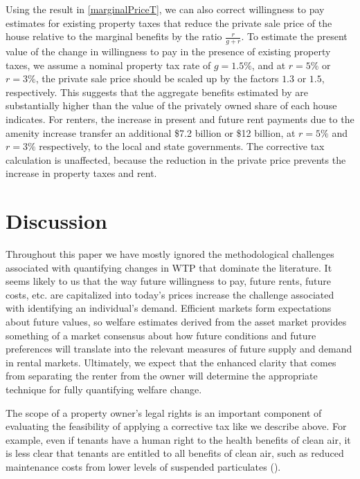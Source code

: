 \documentclass[ecta,nameyear,draft]{econsocart}
\theoremstyle{plain}
\theoremstyle{remark}
\begin{document}
Using the result in \ref{marginalPriceT}, we can also correct willingness to pay estimates for existing property taxes that reduce the private sale price of the house relative to the marginal benefits by the ratio $\frac{r}{g+r}$. To estimate the present value of the change in willingness to pay in the presence of existing property taxes, we assume a nominal property tax rate of $g=1.5\%$, and at $r=5\%$ or $r=3\%$, the private sale price should be scaled up by the factors $1.3$ or $1.5$, respectively. This suggests that the aggregate benefits estimated by \cite{chaygreenstone05} are substantially higher than the value of the privately owned share of each house indicates. For renters, the increase in present and future rent payments due to the amenity increase transfer an additional \$7.2 billion or \$12 billion, at $r=5\%$ and $r=3\%$ respectively, to the local and state governments. The corrective tax calculation is unaffected, because the reduction in the private price prevents the increase in property taxes and rent.




\section{Discussion}
Throughout this paper we have mostly ignored the methodological challenges associated with quantifying changes in WTP that dominate the literature. It seems likely to us that the way future willingness to pay, future rents, future costs, etc. are capitalized into today's prices increase the challenge associated with identifying an individual's demand. Efficient markets form expectations about future values, so welfare estimates derived from the asset market provides something of a market consensus about how future conditions and future preferences will translate into the relevant measures of future supply and demand in rental markets. Ultimately, we expect that the enhanced clarity that comes from separating the renter from the owner will  determine the appropriate technique for fully quantifying welfare change.

The scope of a property owner's legal rights is an important component of evaluating the feasibility of applying a corrective tax like we describe above. For example, even if tenants have a human right to the health benefits of clean air, it is less clear that tenants are entitled to all benefits of clean air, such as reduced maintenance costs from lower levels of suspended particulates (\cite{bajari12}). 
\end{document}
